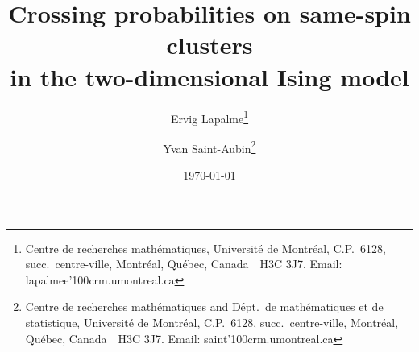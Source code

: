 \documentclass[a4paper,12pt]{article}
\begin{document}
 
 
\title{Crossing probabilities on same-spin clusters\\
in the two-dimensional Ising model} 
\author{ 
Ervig Lapalme\footnote{Centre de recherches math\'ematiques, 
Universit\'e de Montr\'eal, C.P.\ 6128, succ.\ centre-ville,
Montr\'eal,  Qu\'ebec, Canada\ \ H3C 3J7. Email: {\ttfamily
lapalmee{\char'100}crm.umontreal.ca}}
\and Yvan Saint-Aubin\footnote{
Centre de recherches math\'ematiques and 
D\'ept.\ de math\'ematiques et de statistique,
Universit\'e de Montr\'eal, C.P.\ 6128, succ.\ centre-ville,
Montr\'eal,  Qu\'ebec, Canada\ \ H3C 3J7.
Email: {\ttfamily saint{\char'100}crm.umontreal.ca}}
}
\date{\today} 
 
 

\maketitle 
 
\end{document}
